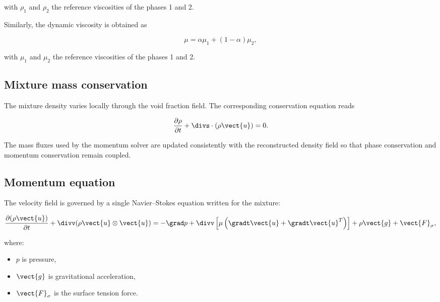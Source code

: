 with $\rho_1$ and $\rho_2$ the reference viscosities of the phases 1 and 2.

Similarly, the dynamic viscosity is obtained as

\begin{equation}
\mu=\alpha \mu_1+(1-\alpha)\mu_2 ,
\label{eq:vof:mu_mix}
\end{equation}

with $\mu_1$ and $\mu_2$ the reference viscosities of the phases 1 and 2.


\subsection{Mixture mass conservation}

The mixture density varies locally through the void fraction field.
The corresponding conservation equation reads

\begin{equation}
\frac{\partial \rho}{\partial t}+\divs \cdot (\rho \vect{u})=0.
\label{eq:vof:mass}
\end{equation}

The mass fluxes used by the momentum solver are updated consistently
with the reconstructed density field so that phase conservation and
momentum conservation remain coupled.


\subsection{Momentum equation}

The velocity field is governed by a single Navier--Stokes equation
written for the mixture:

\begin{equation}
\frac{\partial (\rho \vect{u})}{\partial t}
  +\divv (\rho \vect{u}\otimes\vect{u})
=-\grad p
+\divv\left[\mu\left(\gradt\vect{u}+\gradt\vect{u}^{T}\right)\right]
+\rho \vect{g}+\vect{F}_{\sigma},
\label{eq:vof:momentum}
\end{equation}

where:

\begin{itemize}
\item $p$ is pressure,
\item $\vect{g}$ is gravitational acceleration,
\item $\vect{F}_{\sigma}$ is the surface tension force.
\end{itemize}

